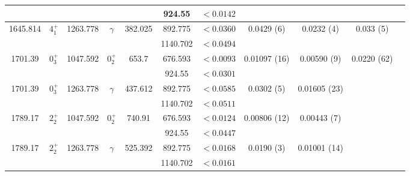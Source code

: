 \begin{landscape}
\begin{longtable}{>{\footnotesize}c|>{\footnotesize}c|>{\footnotesize}c|>{\footnotesize}c|>{\footnotesize}c|>{\footnotesize}c|>{\footnotesize}c|>{\footnotesize}c|>{\footnotesize}c|>{\footnotesize}c|>{\footnotesize}c}
         & & &   &  & 924.55 &  $<0.0142$ & & & \\ \hline
        1645.814 & $4^+_1$ & 1263.778 & $\gamma$ & 382.025 & 892.775 & $<0.0360$ & 0.0429 (6) & 0.0232 (4) & 0.033 (5) \\
         & & &   &  & 1140.702 & $<0.0494$ & & & \\ \hline
        1701.39 & $0^+_3$ & 1047.592 & $0^+_2$ & 653.7 & 676.593 & $<0.0093$ & 0.01097 (16) & 0.00590 (9) & 0.0220 (62)  \\
        &  & &  &  & 924.55 & $<0.0301$ & & & \\ \hline
        1701.39 & $0^+_3$ & 1263.778 & $\gamma$ & 437.612 & 892.775 & $<0.0585$ & 0.0302 (5) & 0.01605 (23) &   \\
        &  & &  &  & 1140.702 & $<0.0511$ & & &   \\ \hline
        1789.17 & $2^+_2$ & 1047.592 & $0^+_2$ & 740.91 & 676.593 & $<0.0124$ & 0.00806 (12) & 0.00443 (7) & \\
        &  & &  &  & 924.55 & $<0.0447$ & & &  \\ \hline
        1789.17 & $2^+_2$ & 1263.778 & $\gamma$ & 525.392 & 892.775 & $<0.0168$ & 0.0190 (3) & 0.01001 (14) &  \\
        &  & &  &  & 1140.702 & $<0.0161$ & & &  \\
        \bottomrule
    \end{longtable}
\end{landscape}